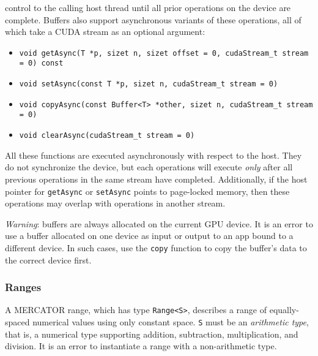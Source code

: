 \documentclass[11pt]{article}
\newcommand{\sizet}{size\textunderscore{}t}
\begin{document}
control to the calling host thread until all prior operations on the
device are complete. Buffers also support asynchronous variants of these
operations, all of which take a CUDA stream as an optional argument:
\begin{itemize}

\item \texttt{void getAsync(T *p, \sizet{} n, \sizet{} offset = 0, cudaStream_t stream = 0) const}

\item \texttt{void setAsync(const T *p, \sizet{} n, cudaStream_t stream = 0)}

\item \texttt{void copyAsync(const Buffer<T> *other, \sizet{} n, cudaStream_t stream = 0)}

\item \texttt{void clearAsync(cudaStream_t stream = 0)}

\end{itemize}
All these functions are executed asynchronously with respect to the
host.  They do not synchronize the device, but each operations will
execute \emph{only} after all previous operations in the same stream
have completed.  Additionally, if the host pointer for
\texttt{getAsync} or \texttt{setAsync} points to page-locked memory,
then these operations may overlap with operations in another stream.

\textit{Warning}: buffers are always allocated on the current GPU device.
It is an error to use a buffer allocated on one device as input or output
to an app bound to a different device.  In such cases, use the \texttt{copy}
function to copy the buffer's data to the correct device first.

\subsubsection{Ranges}

A MERCATOR range, which has type \texttt{Range<S>}, describes a range
of equally-spaced numerical values using only constant space.
\texttt{S} must be an \textit{arithmetic type}, that is, a numerical
type supporting addition, subtraction, multiplication, and division.
It is an error to instantiate a range with a non-arithmetic type.
\end{document}
